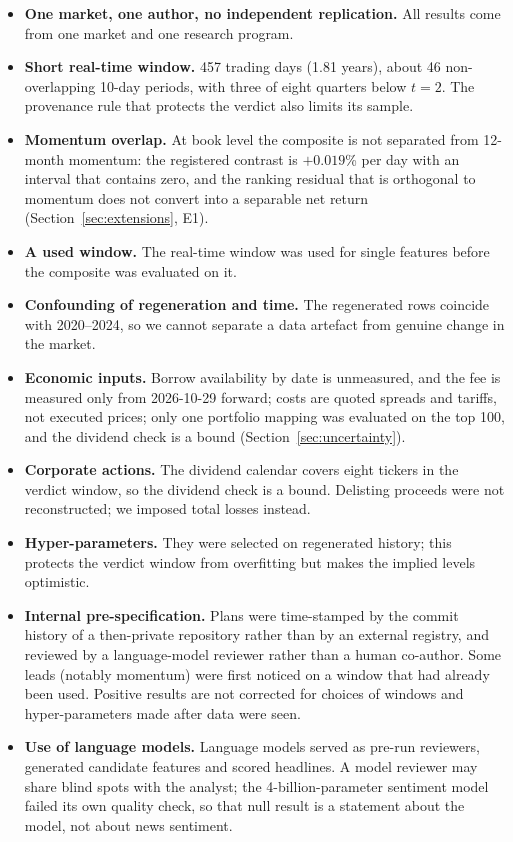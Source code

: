 \begin{itemize}
\item \textbf{One market, one author, no independent replication.} All results come from one market and one research program.
\item \textbf{Short real-time window.} 457 trading days (1.81 years), about 46 non-overlapping 10-day periods, with three of eight quarters below $t=2$. The provenance rule that protects the verdict also limits its sample.
\item \textbf{Momentum overlap.} At book level the composite is not separated from 12-month momentum: the registered contrast is $+0.019$\% per day with an interval that contains zero, and the ranking residual that is orthogonal to momentum does not convert into a separable net return (Section~\ref{sec:extensions}, E1).
\item \textbf{A used window.} The real-time window was used for single features before the composite was evaluated on it.
\item \textbf{Confounding of regeneration and time.} The regenerated rows coincide with 2020--2024, so we cannot separate a data artefact from genuine change in the market.
\item \textbf{Economic inputs.} Borrow availability by date is unmeasured, and the fee is measured only from 2026-10-29 forward; costs are quoted spreads and tariffs, not executed prices; only one portfolio mapping was evaluated on the top 100, and the dividend check is a bound (Section~\ref{sec:uncertainty}).
\item \textbf{Corporate actions.} The dividend calendar covers eight tickers in the verdict window, so the dividend check is a bound. Delisting proceeds were not reconstructed; we imposed total losses instead.
\item \textbf{Hyper-parameters.} They were selected on regenerated history; this protects the verdict window from overfitting but makes the implied levels optimistic.
\item \textbf{Internal pre-specification.} Plans were time-stamped by the commit history of a then-private repository rather than by an external registry, and reviewed by a language-model reviewer rather than a human co-author. Some leads (notably momentum) were first noticed on a window that had already been used. Positive results are not corrected for choices of windows and hyper-parameters made after data were seen.
\item \textbf{Use of language models.} Language models served as pre-run reviewers, generated candidate features and scored headlines. A model reviewer may share blind spots with the analyst; the 4-billion-parameter sentiment model failed its own quality check, so that null result is a statement about the model, not about news sentiment.
\end{itemize}


